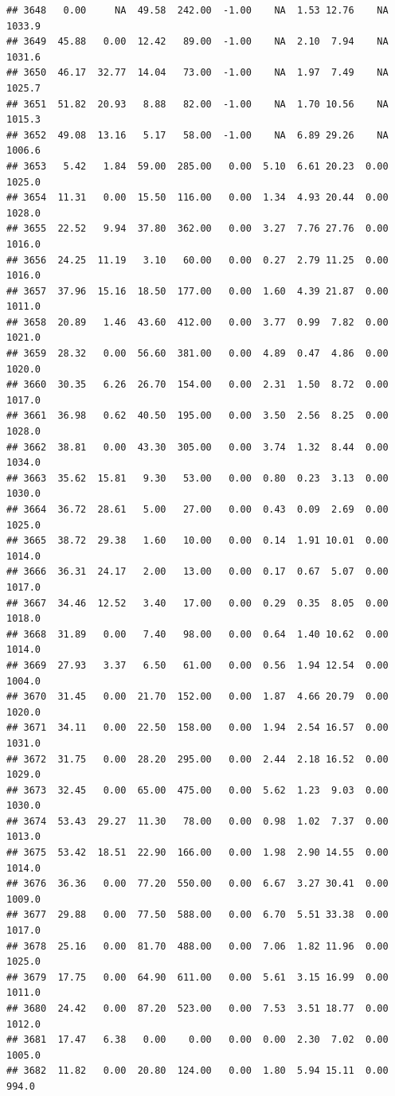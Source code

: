 \documentclass{article}\usepackage{graphicx, color}
\makeatletter
\newenvironment{kframe}{%
 \def\at@end@of@kframe{}%
 \ifinner\ifhmode%
  \def\at@end@of@kframe{\end{minipage}}%
  \begin{minipage}{\columnwidth}%
 \fi\fi%
 \def\FrameCommand##1{\hskip\@totalleftmargin \hskip-\fboxsep
 \colorbox{shadecolor}{##1}\hskip-\fboxsep
     \hskip-\linewidth \hskip-\@totalleftmargin \hskip\columnwidth}%
 \MakeFramed {\advance\hsize-\width
   \@totalleftmargin\z@ \linewidth\hsize
   \@setminipage}}%
 {\par\unskip\endMakeFramed%
 \at@end@of@kframe}
\newenvironment{knitrout}{}{} %
\makeatother
\begin{document}
\begin{knitrout}
\begin{kframe}
\begin{verbatim}
## 3648   0.00     NA  49.58  242.00  -1.00    NA  1.53 12.76    NA 1033.9
## 3649  45.88   0.00  12.42   89.00  -1.00    NA  2.10  7.94    NA 1031.6
## 3650  46.17  32.77  14.04   73.00  -1.00    NA  1.97  7.49    NA 1025.7
## 3651  51.82  20.93   8.88   82.00  -1.00    NA  1.70 10.56    NA 1015.3
## 3652  49.08  13.16   5.17   58.00  -1.00    NA  6.89 29.26    NA 1006.6
## 3653   5.42   1.84  59.00  285.00   0.00  5.10  6.61 20.23  0.00 1025.0
## 3654  11.31   0.00  15.50  116.00   0.00  1.34  4.93 20.44  0.00 1028.0
## 3655  22.52   9.94  37.80  362.00   0.00  3.27  7.76 27.76  0.00 1016.0
## 3656  24.25  11.19   3.10   60.00   0.00  0.27  2.79 11.25  0.00 1016.0
## 3657  37.96  15.16  18.50  177.00   0.00  1.60  4.39 21.87  0.00 1011.0
## 3658  20.89   1.46  43.60  412.00   0.00  3.77  0.99  7.82  0.00 1021.0
## 3659  28.32   0.00  56.60  381.00   0.00  4.89  0.47  4.86  0.00 1020.0
## 3660  30.35   6.26  26.70  154.00   0.00  2.31  1.50  8.72  0.00 1017.0
## 3661  36.98   0.62  40.50  195.00   0.00  3.50  2.56  8.25  0.00 1028.0
## 3662  38.81   0.00  43.30  305.00   0.00  3.74  1.32  8.44  0.00 1034.0
## 3663  35.62  15.81   9.30   53.00   0.00  0.80  0.23  3.13  0.00 1030.0
## 3664  36.72  28.61   5.00   27.00   0.00  0.43  0.09  2.69  0.00 1025.0
## 3665  38.72  29.38   1.60   10.00   0.00  0.14  1.91 10.01  0.00 1014.0
## 3666  36.31  24.17   2.00   13.00   0.00  0.17  0.67  5.07  0.00 1017.0
## 3667  34.46  12.52   3.40   17.00   0.00  0.29  0.35  8.05  0.00 1018.0
## 3668  31.89   0.00   7.40   98.00   0.00  0.64  1.40 10.62  0.00 1014.0
## 3669  27.93   3.37   6.50   61.00   0.00  0.56  1.94 12.54  0.00 1004.0
## 3670  31.45   0.00  21.70  152.00   0.00  1.87  4.66 20.79  0.00 1020.0
## 3671  34.11   0.00  22.50  158.00   0.00  1.94  2.54 16.57  0.00 1031.0
## 3672  31.75   0.00  28.20  295.00   0.00  2.44  2.18 16.52  0.00 1029.0
## 3673  32.45   0.00  65.00  475.00   0.00  5.62  1.23  9.03  0.00 1030.0
## 3674  53.43  29.27  11.30   78.00   0.00  0.98  1.02  7.37  0.00 1013.0
## 3675  53.42  18.51  22.90  166.00   0.00  1.98  2.90 14.55  0.00 1014.0
## 3676  36.36   0.00  77.20  550.00   0.00  6.67  3.27 30.41  0.00 1009.0
## 3677  29.88   0.00  77.50  588.00   0.00  6.70  5.51 33.38  0.00 1017.0
## 3678  25.16   0.00  81.70  488.00   0.00  7.06  1.82 11.96  0.00 1025.0
## 3679  17.75   0.00  64.90  611.00   0.00  5.61  3.15 16.99  0.00 1011.0
## 3680  24.42   0.00  87.20  523.00   0.00  7.53  3.51 18.77  0.00 1012.0
## 3681  17.47   6.38   0.00    0.00   0.00  0.00  2.30  7.02  0.00 1005.0
## 3682  11.82   0.00  20.80  124.00   0.00  1.80  5.94 15.11  0.00  994.0

\end{verbatim}
\end{kframe}
\end{knitrout}
\end{document}
